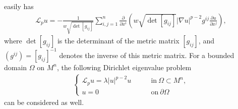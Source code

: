 \documentclass[12pt]{article}
\begin{document}
easily has
\begin{eqnarray*}
\mathcal{L}_{p}u=-\frac{1}{w\sqrt{\det
[g_{ij}]}}\sum_{i,j=1}^{n}\frac{\partial}{\partial x^{i}}
\left(w\sqrt{\det [g_{ij}]}|\nabla u|^{p-2}g^{ij}\frac{\partial
u}{\partial x^{j}}\right),
\end{eqnarray*}
where $\det [g_{ij}]$ is the determinant of the metric matrix
$[g_{ij}]$, and $(g^{ij})=[g_{ij}]^{-1}$ denotes the inverse of this
 metric matrix. For a bounded domain $\Omega$ on $M^{n}$, the following Dirichlet eigenvalue problem
\begin{eqnarray} \label{eigenp-wpl}
\left\{
\begin{array}{ll}
\mathcal{L}_{p}u=\lambda|u|^{p-2}u  \qquad & \mathrm{in}~\Omega\subset M^n,\\
u=0\qquad & \mathrm{on}~\partial\Omega
\end{array}
\right.
\end{eqnarray}
can be considered as well.
\end{document}
